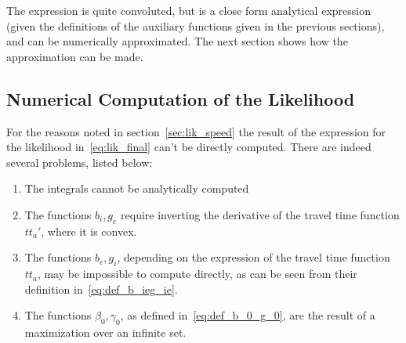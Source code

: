 The expression is quite convoluted, but is a close form analytical expression
(given the definitions of the auxiliary functions given in the previous sections),
and can be numerically approximated.
The next section shows how the approximation can be made.

\subsection{Numerical Computation of the Likelihood}
\label{sec:numerical_lik}

For the reasons noted in section~\ref{sec:lik_speed}
the result of the expression for the likelihood in~\eqref{eq:lik_final} can't be directly computed.
There are indeed several problems, listed below:
\begin{enumerate}
\item The integrals cannot be analytically computed
\item The functions \(b_i, g_e\) require inverting the derivative of the travel time function \(tt_a'\),
  where it is convex.
\item The functions \(b_e, g_i\), depending on the expression of the travel time function \(tt_a\),
  may be impossible to compute directly, as can be seen from their definition in~\eqref{eq:def_b_ieg_ie}.
\item The functions \(\beta_0, \gamma_0\), as defined in~\eqref{eq:def_b_0_g_0},
  are the result of a maximization over an infinite set.
\end{enumerate}

